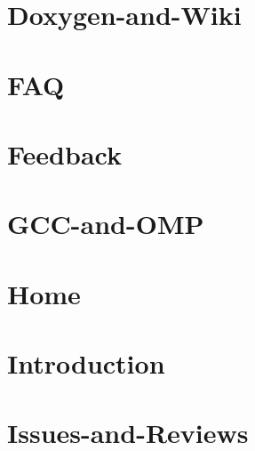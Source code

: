 \let\mypdfximage\pdfximage\def\pdfximage{\immediate\mypdfximage}\documentclass[twoside]{book}
\newcommand{\+}{\discretionary{\mbox{\scriptsize$\hookleftarrow$}}{}{}}
\begin{document}
\chapter{Doxygen-\/and-\/\+Wiki}
\label{md__home_rvree__t_s_g_l_2_81__t_s_g_l__t_s_g_l_8wiki__doxygen-and-_wiki}

\chapter{F\+AQ}
\label{md__home_rvree__t_s_g_l_2_81__t_s_g_l__t_s_g_l_8wiki__f_a_q}

\chapter{Feedback}
\label{md__home_rvree__t_s_g_l_2_81__t_s_g_l__t_s_g_l_8wiki__feedback}

\chapter{G\+C\+C-\/and-\/\+O\+MP}
\label{md__home_rvree__t_s_g_l_2_81__t_s_g_l__t_s_g_l_8wiki__g_c_c-and-_o_m_p}

\chapter{Home}
\label{md__home_rvree__t_s_g_l_2_81__t_s_g_l__t_s_g_l_8wiki__home}

\chapter{Introduction}
\label{md__home_rvree__t_s_g_l_2_81__t_s_g_l__t_s_g_l_8wiki__installing-_t_s_g_l}

\chapter{Issues-\/and-\/\+Reviews}
\label{md__home_rvree__t_s_g_l_2_81__t_s_g_l__t_s_g_l_8wiki__issues-and-_reviews}

\end{document}
